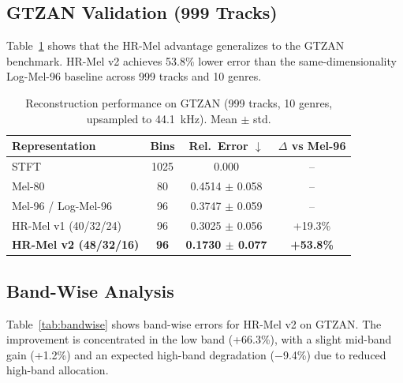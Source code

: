 \documentclass[twocolumn]{article}
\begin{document}
\subsection{GTZAN Validation (999 Tracks)}

Table~\ref{tab:overall_gtzan} shows that the HR-Mel advantage generalizes to the GTZAN benchmark. HR-Mel v2 achieves 53.8\% lower error than the same-dimensionality Log-Mel-96 baseline across 999 tracks and 10 genres.

\begin{table}[t]
\centering
\caption{Reconstruction performance on GTZAN (999 tracks, 10 genres, upsampled to 44.1~kHz). Mean $\pm$ std.}
\label{tab:overall_gtzan}
\small
\begin{tabular}{@{}lccc@{}}
\toprule
Representation & Bins & Rel.\ Error $\downarrow$ & $\Delta$ vs Mel-96 \\
\midrule
STFT & 1025 & 0.000 & -- \\
\midrule
Mel-80 & 80 & 0.4514 $\pm$ 0.058 & -- \\
Mel-96 / Log-Mel-96 & 96 & 0.3747 $\pm$ 0.059 & -- \\
HR-Mel v1 (40/32/24) & 96 & 0.3025 $\pm$ 0.056 & +19.3\% \\
\textbf{HR-Mel v2 (48/32/16)} & \textbf{96} & \textbf{0.1730 $\pm$ 0.077} & \textbf{+53.8\%} \\
\bottomrule
\end{tabular}
\end{table}

\subsection{Band-Wise Analysis}

Table~\ref{tab:bandwise} shows band-wise errors for HR-Mel v2 on GTZAN. The improvement is concentrated in the low band (+66.3\%), with a slight mid-band gain (+1.2\%) and an expected high-band degradation ($-$9.4\%) due to reduced high-band allocation.

\begin{table}[t]
\centering
\caption{Band-wise reconstruction errors on GTZAN (HR-Mel v2, 48/32/16). $\Delta$ is improvement relative to Mel-96.}
\label{tab:bandwise}
\small
{}
\end{table}
\end{document}
